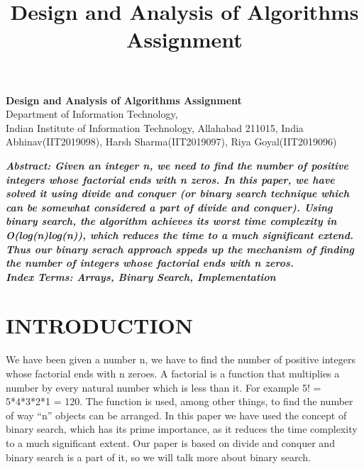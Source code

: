 \documentclass[10pt]{article}
\author{}
\title{\Large{Design and Analysis of Algorithms Assignment}}
\begin{document}
	
	\begin{center}
		{\Large \textbf{Design and Analysis of Algorithms Assignment}}\\
		\vspace{1em}
		{\large Department of Information Technology,}\\
		\vspace{1em}
		\large{Indian Institute of Information Technology, Allahabad 211015, India}\\
		\vspace{1em}
		\large{Abhinav(IIT2019098), Harsh Sharma(IIT2019097), Riya Goyal(IIT2019096)}
		\vspace{2.5em}
		
	\end{center}
	
\begin{multicols*}{2}

    \textbf{\emph{{Abstract}: Given an integer n, we need to find the number of positive integers whose factorial ends with n zeros. In this paper, we have solved it using divide and conquer (or binary search technique which can be somewhat considered a part of divide and conquer). Using binary search, the algorithm achieves its worst time complexity in O(log(n)log(n)), which reduces the time to a much significant extend. Thus our binary serach approach sppeds up the mechanism of finding the number of integers whose factorial ends with n zeros.}}\\
	
	\textbf{\emph{{Index Terms}: Arrays, Binary Search, Implementation\\}}


\section*{INTRODUCTION}

We have been given a number n, we have to find the number of positive integers whose factorial ends with n zeroes. 
A factorial is a function that multiplies a number by every natural number which is less than it. For example 5! = 5*4*3*2*1 = 120. The function is used, among other things, to find the number of way “n” objects can be arranged.
In this paper we have used the concept of binary search, which has its prime importance, as it reduces the time complexity to a much significant extent. Our paper is based on divide and conquer and binary search is a part of it, so we will talk more about binary search.


\end{multicols*}
\end{document}
